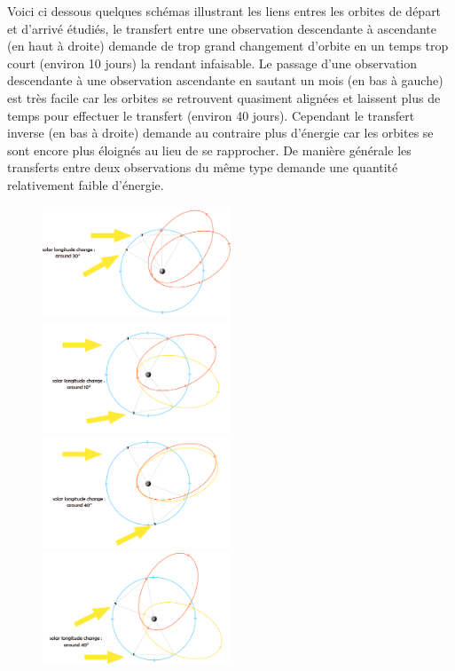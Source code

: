 \documentclass[11pt]{article} %
\begin{document}
		Voici ci dessous quelques schémas illustrant les liens entres les orbites de départ et d'arrivé étudiés, le transfert entre une observation descendante à ascendante (en haut à droite) demande de trop grand changement d'orbite en un temps trop court (environ 10 jours) la rendant infaisable. Le passage d'une observation descendante à une observation ascendante en sautant un mois (en bas à gauche) est très facile car les orbites se retrouvent quasiment alignées et laissent plus de temps pour effectuer le transfert (environ 40 jours). Cependant le transfert inverse (en bas à droite) demande au contraire plus d'énergie car les orbites se sont encore plus éloignés au lieu de se rapprocher. De manière générale les transferts entre deux observations du même type demande une quantité relativement faible d'énergie.
		\begin{figure}[H]
			\includegraphics[width=0.5\textwidth]{images/1in2obs.png}
			\includegraphics[width=0.5\textwidth]{images/odd_to_even.png}
			\includegraphics[width=0.5\textwidth]{images/1in3_obs.png}
			\includegraphics[width=0.5\textwidth]{images/1in3_bad.png}
		\end{figure}
		
\end{document}
